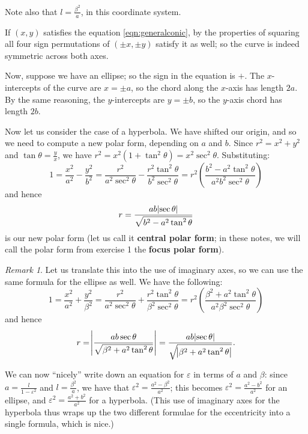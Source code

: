 \documentclass[a4paper,leqno,10pt]{article}
\theoremstyle{exercise}
\theoremstyle{plain}
\theoremstyle{definition}
\theoremstyle{remark}
\newtheorem*{rem}{Remark}
\newcommand{\df}{\textbf}
\begin{document}
Note also that $ l = \frac{\beta^2}{a} $, in this coordinate system.

If $ (x,y) $ satisfies the equation \ref{eqn:generalconic}, by the properties of squaring all four sign permutations of $ (\pm x , \pm y) $ satisfy it as
well; so the curve is indeed symmetric across both axes.

Now, suppose we have an ellipse; so the sign in the equation is $ + $. The $ x$-intercepts of the curve are $ x = \pm a $, so the chord along
the $ x$-axis has length $ 2a $. By the same reasoning, the $ y$-intercepts are $ y = \pm b $, so the $ y$-axis chord has length $ 2b $.

Now let us consider the case of a hyperbola. We have shifted our origin, and so we need to compute a new polar form, depending on $ a $
and $ b $. Since $ r^2 = x^2 + y^2 $ and $ \tan \theta = \frac{y}{x} $, we have $ r^2 = x^2(1 + \tan^2 \theta) = x^2 \sec^2 \theta $.
Substituting:
\begin{displaymath}
  1 = \frac{x^2}{a^2} - \frac{y^2}{b^2} = \frac{r^2}{a^2\sec^2 \theta} - \frac{r^2 \tan^2 \theta}{b^2\sec^2 \theta} = r^2 \left( \frac{b^2 - a^2 \tan^2 \theta}{a^2b^2 \sec^2\theta} \right)
\end{displaymath}
and hence
\begin{equation}
  r = \frac{ab \abs{\sec \theta}}{\sqrt{b^2 - a^2 \tan^2 \theta}}
\end{equation}
is our new polar form (let us call it \df{central polar form}; in these notes, we will call the polar form from exercise 1 the \df{focus polar form}).

\begin{rem}
  Let us translate this into the use of imaginary axes, so we can use the same formula for the ellipse as well. We have the following:
  \begin{displaymath}
    1 = \frac{x^2}{a^2} + \frac{y^2}{\beta^2} = \frac{r^2}{a^2\sec^2 \theta} + \frac{r^2 \tan^2 \theta}{\beta^2\sec^2 \theta} = r^2 \left( \frac{\beta^2 + a^2 \tan^2 \theta}{a^2\beta^2 \sec^2\theta} \right)
  \end{displaymath}
  and hence
  \begin{equation}
    r = \abs{\frac{ab \sec \theta}{\sqrt{\beta^2 + a^2 \tan^2 \theta}}} = \frac{ab \abs{\sec \theta}}{\sqrt{\abs{\beta^2 + a^2 \tan^2 \theta}}}.
  \end{equation}

  We can now ``nicely'' write down an equation for $ \varepsilon $ in terms of $ a $ and $ \beta $: since $ a = \frac{l}{1 - \varepsilon^2} $
  and $ l = \frac{\beta^2}{a} $, we have that $ \varepsilon^2 = \frac{a^2 - \beta^2}{a^2} $; this becomes $ \varepsilon^2 = \frac{a^2 - b^2}{a^2} $
  for an ellipse, and $ \varepsilon^2 = \frac{a^2 + b^2}{a^2} $ for a hyperbola. (This use of imaginary axes for the hyperbola thus wraps up the
  two different formulae for the eccentricity into a single formula, which is nice.)
\end{rem}
\end{document}
